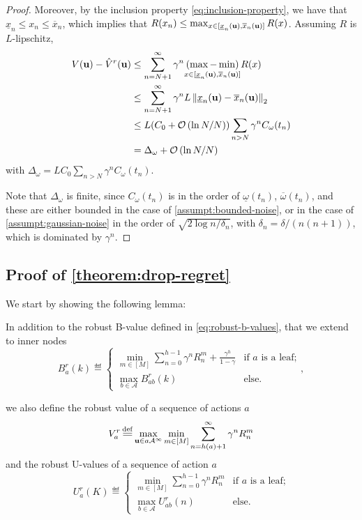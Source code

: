 \begin{subappendices}
\begin{proof}
		Moreover, by the inclusion property \eqref{eq:inclusion-property}, we have that $\underline{x}_n \leq x_n \leq \overline{x}_n$, which implies that $R(x_n) \leq \max_{x\in[\underline{x}_n(\mathbf{u}), \overline{x}_n(\mathbf{u})]}  R(x)$. Assuming $R$ is $L$-lipschitz,
		\begin{align*}
		V(\mathbf{u}) - \hat{V}^r(\mathbf{u}) &\leq \sum_{n=N+1}^\infty \gamma^n \underset{{x\in[\underline{x}_n(\mathbf{u}), \overline{x}_n(\mathbf{u})]}}{(\max - \min)} R(x)\\
		&\leq \sum_{n=N+1}^\infty \gamma^n L \left\|\underline{x}_n(\mathbf{u}) - \overline{x}_n(\mathbf{u})\right\|_2\\
		&\leq L(C_0 + \mathcal{O}\left({\ln N / N}\right)) \sum_{n>N} \gamma^n C_{\omega}(t_n)\\
		&= \Delta_\omega + \mathcal{O}\left({\ln N / N}\right)
		\end{align*}
		with $\Delta_\omega = L C_0\sum_{n>N} \gamma^n C_{\omega}(t_n)$.
		
		Note that $\Delta_\omega$ is finite, since $C_{\omega}(t_n)$ is in the order of $\underline{\omega}(t_n)$, $\overline{\omega}(t_n)$, and these are either bounded in the case of \autoref{assumpt:bounded-noise}, or in the case of \autoref{assumpt:gaussian-noise} in the order of $\sqrt{2\log n / \delta_n}$, with $\delta_n = \delta/(n(n+1))$, which is dominated by $\gamma^n$.
	\end{proof}
	
	
	\subsection{Proof of \autoref{theorem:drop-regret}}
	
	We start by showing the following lemma:
	
	
	\begin{lemma}
		In addition to the robust B-value defined in \eqref{eq:robust-b-values}, that we extend to inner nodes	
		\begin{equation}
		\label{eq:br}
		B_a^r(k)  \eqdef
		\begin{cases}
		\min_{m\in[M]} \sum_{n=0}^{h-1} \gamma^n R_n^m  + \frac{\gamma^h}{1-\gamma}&\text{if } a \text{ is a leaf;}\\
		\max_{b\in\mathcal{A}} B_{ab}^r(k) & \text{else.}
		\end{cases},
		\end{equation}
		
		we also define the robust value of a sequence of actions $a$
		\begin{equation}
		\label{eq:max_vr}
		V_a^r \eqdef \max_{\bu \in a\mathcal{A^\infty}} \min_{m\in[M]} \sum_{n=h(a)+1}^\infty \gamma^n R^m_n
		\end{equation}
		and the robust U-values of a sequence of action $a$
		\begin{equation}
		\label{eq:ur}
		U_a^r(K)  \eqdef
		\begin{cases}
		\min_{m\in[M]} \sum_{n=0}^{h-1} \gamma^n R_n^m &\text{if } a \text{ is a leaf;}\\
		\max_{b\in\mathcal{A}} U_{ab}^r(n) & \text{else.}
		\end{cases}
		\end{equation}
		

\end{lemma}
\end{subappendices}
